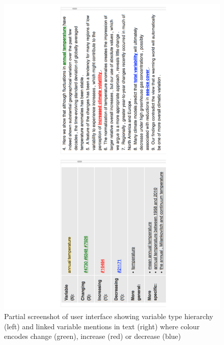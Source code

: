 \documentclass[11pt]{article}
\begin{document}
\begin{figure}[!htb]
\setlength\fboxsep{0pt}
\setlength\fboxrule{0.5pt}
  \includegraphics[scale=0.54,angle=-90,clip=true,trim=56mm 1mm 53mm 0]{screenshot.pdf}
  \caption{Partial screenshot of user interface showing variable type hierarchy (left) and linked variable mentions in text (right)
  where colour encodes change (green), increase (red) or decrease (blue)}
\vspace{4pt}
\label{fig:ui}  
\end{figure}
\end{document}
